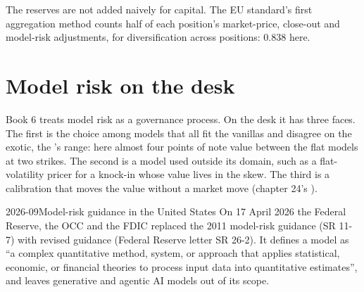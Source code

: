 \begin{omfigure}

\label{fig:dv:managing-an-exotic-book:models}
\end{omfigure}

The reserves are not added naively for capital. The EU standard's first aggregation method counts half of each position's market-price, close-out and model-risk
adjustments, for diversification across positions: 0.838 here.

\section{Model risk on the desk}

Book 6 treats model risk as a governance process. On the desk it has three faces. The first is the choice among models that all fit the vanillas and disagree on
the exotic, the 's range: here almost four points of note value between the flat models at two strikes. The second is a model used outside its
domain, such as a flat-volatility pricer for a knock-in whose value lives in the skew. The third is a calibration that moves the value without a market move
(chapter 24's ).

\begin{dated}{2026-09}{Model-risk guidance in the United States}\label{dat:dv:managing-an-exotic-book:mrm}
On 17 April 2026 the Federal Reserve, the OCC and the FDIC replaced the 2011 model-risk guidance (SR 11-7) with revised guidance (Federal Reserve letter SR 26-2).
It defines a model as ``a complex quantitative method, system, or approach that applies statistical, economic, or financial theories to process input data into
quantitative estimates'', and leaves generative and agentic AI models out of its scope.
\end{dated}

